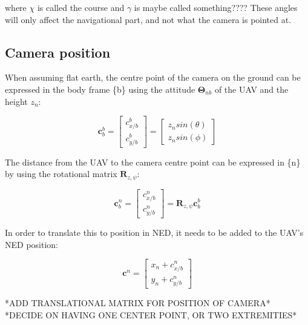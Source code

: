 \documentclass{article}
\begin{document}
where $\chi$ is called the course and $\gamma$ is maybe called something???? These angles will only affect the navigational part, and not what the camera is pointed at.

\subsection*{Camera position}

When assuming flat earth, the centre point of the camera on the ground can be expressed in the body frame \{b\} using the attitude $\bm{\Theta}_{nb}$ of the UAV and the height $z_n$:

\begin{equation}
	\bm{c}_b^b = 
	\begin{bmatrix}
		c_{x/b}^b \\ c_{y/b}^b
	\end{bmatrix}
	=
	\begin{bmatrix}
		z_n sin(\theta) \\ z_n sin(\phi)
	\end{bmatrix}
\end{equation}

The distance from the UAV to the camera centre point can be expressed in \{n\} by using the rotational matrix $\bm{R}_{z,\psi}$:

\begin{equation}
	\bm{c}^n_b = 
	\begin{bmatrix}
		c^n_{x/b} \\ c^n_{y/b}
	\end{bmatrix}
	= \bm{R}_{z, \psi}\bm{c}^b_b
\end{equation}

In order to translate this to position in NED, it needs to be added to the UAV's NED position:

\begin{equation}
	\bm{c}^n =
	\begin{bmatrix}
		x_n + c^n_{x/b} \\
		y_n + c^n_{y/b}
	\end{bmatrix}
\end{equation}

*ADD TRANSLATIONAL MATRIX FOR POSITION OF CAMERA* \\
*DECIDE ON HAVING ONE CENTER POINT, OR TWO EXTREMITIES*
\end{document}
